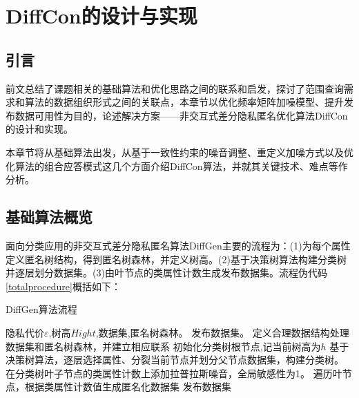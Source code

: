 
\raggedbottom
\chapter{DiffCon的设计与实现}
\label{chap:designandimpl}

\section{引言}

前文总结了课题相关的基础算法和优化思路之间的联系和启发，探讨了范围查询需求和算法的数据组织形式之间的关联点，本章节以优化频率矩阵加噪模型、提升发布数据可用性为目的，论述解决方案——非交互式差分隐私匿名优化算法DiffCon的设计和实现。

本章节将从基础算法出发，从基于一致性约束的噪音调整、重定义加噪方式以及优化算法的组合应答模式这几个方面介绍DiffCon算法，并就其关键技术、难点等作分析。

\section{基础算法概览}

面向分类应用的非交互式差分隐私匿名算法DiffGen主要的流程为：(1)为每个属性定义匿名树结构，得到匿名树森林，并定义树高。(2)基于决策树算法构建分类树并逐层划分数据集。(3)由叶节点的类属性计数生成发布数据集。流程伪代码\ref{totalprocedure}概括如下：

\begin{algorithm}
	\caption{DiffGen算法流程} 
	\label{totalprocedure}
	\begin{algorithmic}[1]
		\REQUIRE 隐私代价$\varepsilon$,树高$Hight$,数据集,匿名树森林。
		\ENSURE 发布数据集。
		\STATE 定义合理数据结构处理数据集和匿名树森林，并建立相应联系
		\STATE 初始化分类树根节点,记当前树高为$h$
		\STATE 基于决策树算法，逐层选择属性、分裂当前节点并划分父节点数据集，构建分类树。
		\ENDWHILE
		\STATE 在分类树叶子节点的类属性计数上添加拉普拉斯噪音，全局敏感性为1。
		\STATE 遍历叶节点，根据类属性计数值生成匿名化数据集
		\RETURN 发布数据集
	\end{algorithmic}
\end{algorithm}

